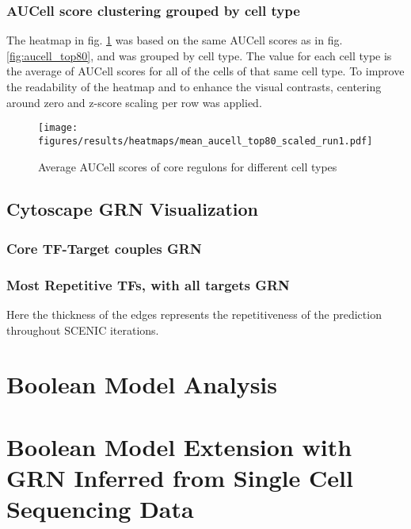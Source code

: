 \subsubsection{AUCell score clustering grouped by cell type}
The heatmap in fig. \ref{fig:aucell_top80_grouped} was based on the same AUCell scores as in fig. \ref{fig:aucell_top80}, 
and was grouped by cell type. The value for each cell type is the average of AUCell scores for all of the cells of that same cell type.
To improve the readability of the heatmap and to enhance the visual contrasts, centering around zero and z-score scaling per row was applied. 
\begin{figure}
    \centering
    \texttt{[image: figures/results/heatmaps/mean\_aucell\_top80\_scaled\_run1.pdf]}
    \caption{Average AUCell scores of core regulons for different cell types}
    \label{fig:aucell_top80_grouped}
\end{figure}
\subsection{Cytoscape GRN Visualization}
\subsubsection{Core TF-Target couples GRN}

\subsubsection{Most Repetitive TFs, with all targets GRN}
Here the thickness of the edges represents the repetitiveness of the prediction throughout SCENIC iterations. 

\section{Boolean Model Analysis}


\section{Boolean Model Extension with GRN Inferred from Single Cell Sequencing Data}